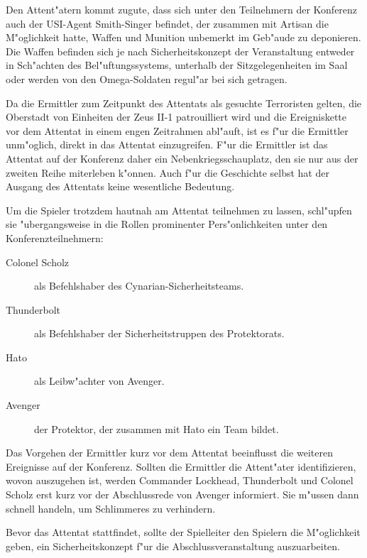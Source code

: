Den Attent"atern kommt zugute, dass sich unter den Teilnehmern der Konferenz auch der USI-Agent Smith-Singer befindet, der zusammen mit Artisan die M"oglichkeit hatte, Waffen und Munition unbemerkt im Geb"aude zu deponieren. Die Waffen befinden sich je nach Sicherheitskonzept der Veranstaltung entweder in Sch"achten des Bel"uftungssystems, unterhalb der Sitzgelegenheiten im Saal oder werden von den Omega-Soldaten regul"ar bei sich getragen.

Da die Ermittler zum Zeitpunkt des Attentats als gesuchte Terroristen gelten, die Oberstadt von Einheiten der Zeus II-1 patrouilliert wird und die Ereigniskette vor dem Attentat in einem engen Zeitrahmen abl"auft, ist es f"ur die Ermittler unm"oglich, direkt in das Attentat einzugreifen. F"ur die Ermittler ist das Attentat auf der Konferenz daher ein Nebenkriegsschauplatz, den sie nur aus der zweiten Reihe miterleben k"onnen. Auch f"ur die Geschichte selbst hat der Ausgang des Attentats keine wesentliche Bedeutung.

Um die Spieler trotzdem hautnah am Attentat teilnehmen zu lassen, schl"upfen sie "ubergangsweise in die Rollen prominenter Pers"onlichkeiten unter den Konferenzteilnehmern:

\begin{description}
	\item[Colonel Scholz] als Befehlshaber des Cynarian-Sicherheitsteams.
	\item[Thunderbolt] als Befehlshaber der Sicherheitstruppen des Protektorats.
	\item[Hato] als Leibw"achter von Avenger.
	\item[Avenger] der Protektor, der zusammen mit Hato ein Team bildet.
\end{description}

Das Vorgehen der Ermittler kurz vor dem Attentat beeinflusst die weiteren Ereignisse auf der Konferenz. Sollten die Ermittler die Attent"ater identifizieren, wovon auszugehen ist, werden Commander Lockhead, Thunderbolt und Colonel Scholz erst kurz vor der Abschlussrede von Avenger informiert. Sie m"ussen dann schnell handeln, um Schlimmeres zu verhindern.

Bevor das Attentat stattfindet, sollte der Spielleiter den Spielern die M"oglichkeit geben, ein Sicherheitskonzept f"ur die Abschlussveranstaltung auszuarbeiten.

